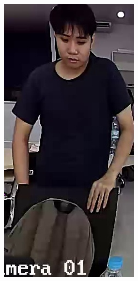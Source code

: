 \begin{figure}[!ht]
\begin{subfigure}[b]{0.1\textwidth}
        \includegraphics[width=\textwidth]{chapter4/images/first_4.jpg}
        \label{fig:ex_5}
    \end{subfigure}

\end{figure}
